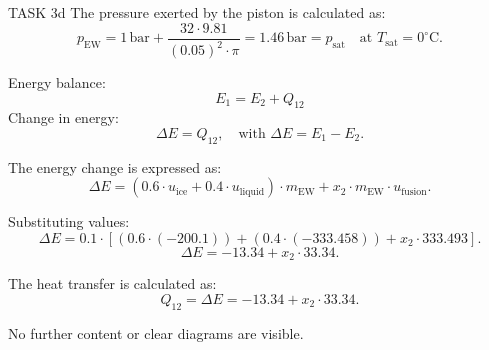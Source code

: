 TASK 3d  
The pressure exerted by the piston is calculated as:  
\[
p_{\text{EW}} = 1 \, \text{bar} + \frac{32 \cdot 9.81}{(0.05)^2 \cdot \pi} = 1.46 \, \text{bar} = p_{\text{sat}} \quad \text{at } T_{\text{sat}} = 0^\circ\text{C}.
\]

Energy balance:  
\[
E_1 = E_2 + Q_{12}
\]  
Change in energy:  
\[
\Delta E = Q_{12}, \quad \text{with } \Delta E = E_1 - E_2.
\]  

The energy change is expressed as:  
\[
\Delta E = (0.6 \cdot u_{\text{ice}} + 0.4 \cdot u_{\text{liquid}}) \cdot m_{\text{EW}} + x_2 \cdot m_{\text{EW}} \cdot u_{\text{fusion}}.
\]  

Substituting values:  
\[
\Delta E = 0.1 \cdot \left[ (0.6 \cdot (-200.1)) + (0.4 \cdot (-333.458)) + x_2 \cdot 333.493 \right].
\]  
\[
\Delta E = -13.34 + x_2 \cdot 33.34.
\]  

The heat transfer is calculated as:  
\[
Q_{12} = \Delta E = -13.34 + x_2 \cdot 33.34.
\]  

No further content or clear diagrams are visible.